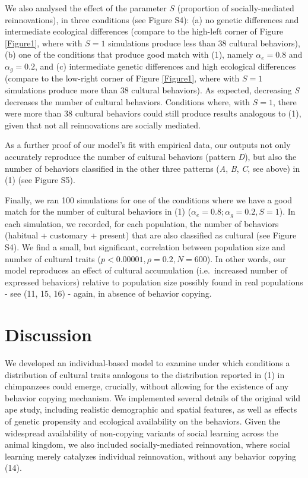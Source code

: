 \documentclass[9pt,twocolumn,twoside,]{pnas-new}
\begin{document}
We also analysed the effect of the parameter \(S\) (proportion of
socially-mediated reinnovations), in three conditions (see Figure S4):
(a) no genetic differences and intermediate ecological differences
(compare to the high-left corner of Figure \ref{Figure1}, where with
\(S=1\) simulations produce less than 38 cultural behaviors), (b) one of
the conditions that produce good match with (1), namely \(\alpha_e=0.8\)
and \(\alpha_g=0.2\), and (c) intermediate genetic differences and high
ecological differences (compare to the low-right corner of Figure
\ref{Figure1}, where with \(S=1\) simulations produce more than 38
cultural behaviors). As expected, decreasing \emph{S} decreases the
number of cultural behaviors. Conditions where, with \(S=1\), there were
more than 38 cultural behaviors could still produce results analogous to
(1), given that not all reinnovations are socially mediated.

As a further proof of our model's fit with empirical data, our outputs
not only accurately reproduce the number of cultural behaviors (pattern
\emph{D}), but also the number of behaviors classified in the other
three patterns (\emph{A}, \emph{B}, \emph{C}, see above) in (1) (see
Figure S5).

Finally, we ran 100 simulations for one of the conditions where we have
a good match for the number of cultural behaviors in (1)
(\(\alpha_e=0.8;\alpha_g=0.2, S=1\)). In each simulation, we recorded,
for each population, the number of behaviors (habitual + customary +
present) that are also classified as cultural (see Figure S4). We find a
small, but significant, correlation between population size and number
of cultural traits (\(p<0.00001,\rho=0.2,N=600\)). In other words, our
model reproduces an effect of cultural accumulation (i.e.~increased
number of expressed behaviors) relative to population size possibly
found in real populations - see (11, 15, 16) - again, in absence of
behavior copying.

\hypertarget{discussion}{%
\section*{Discussion}\label{discussion}}

We developed an individual-based model to examine under which conditions
a distribution of cultural traits analogous to the distribution reported
in (1) in chimpanzees could emerge, crucially, without allowing for the
existence of any behavior copying mechanism. We implemented several
details of the original wild ape study, including realistic demographic
and spatial features, as well as effects of genetic propensity and
ecological availability on the behaviors. Given the widespread
availability of non-copying variants of social learning across the
animal kingdom, we also included socially-mediated reinnovation, where
social learning merely catalyzes individual reinnovation, without any
behavior copying (14).
\end{document}
